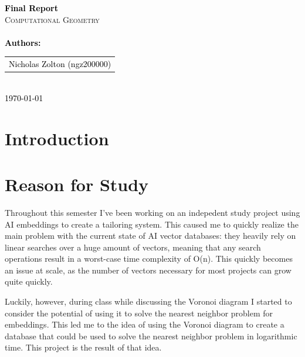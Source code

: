 \documentclass{article}
\begin{document}
\begin{titlepage}
    \selectfont 
    \vspace*{3cm}
    
    \centering
    {\Huge \textbf{\textcolor{black}{Final Report}}}\\[1.5cm]
    \textsc{\LARGE Computational Geometry}\\[0.5cm]
    \\[2cm]
    
    {\Large \textbf{\textcolor{black}{Authors:}}}\\[0.5cm]
    \begin{tabular}{c}
        \Large \textcolor{black}{Nicholas Zolton (ngz200000)} \\
    \end{tabular}\\[2cm]
    
    {\Large \textcolor{black}{\today}}
    
    \vfill
\addtocounter{page}{-2}
\end{titlepage}

\tableofcontents
\addtocounter{page}{-1}
\newpage

\section*{Introduction}

\section{Reason for Study}
Throughout this semester I've been working on an indepedent study 
project using AI embeddings to create a tailoring system. 
This caused me to quickly realize the main problem with the current
state of AI vector databases: they heavily rely on linear searches over a huge amount of vectors, meaning that any search operations result in a worst-case time complexity of O(n). This quickly becomes an issue
at scale, as the number of vectors necessary for most projects can 
grow quite quickly.
\newline

\noindent
Luckily, however, during class while discussing the Voronoi diagram
I started to consider the potential of using it to solve the nearest
neighbor problem for embeddings. This led me to the idea of using the Voronoi diagram
to create a database that could be used to solve the nearest neighbor
problem in logarithmic time. This project is the result of that idea.
\end{document}
